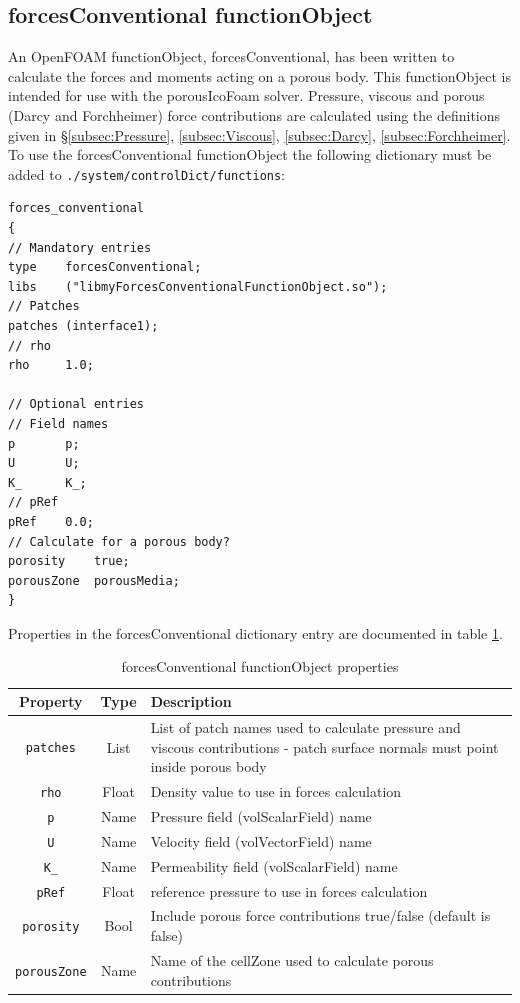 \documentclass[a4paper,11pt]{report}
\begin{document}
\subsection{forcesConventional functionObject} \label{subsec:forcesConventional}
An OpenFOAM functionObject, forcesConventional, has been written to calculate the forces and moments acting on a porous body. This functionObject is intended for use with the porousIcoFoam solver. Pressure, viscous and porous (Darcy and Forchheimer) force contributions are calculated using the definitions given in §\ref{subsec:Pressure}, \ref{subsec:Viscous}, \ref{subsec:Darcy}, \ref{subsec:Forchheimer}.
\vspace{5mm}\\
To use the forcesConventional functionObject the following dictionary must be added to \texttt{./system/controlDict/functions}:
\begin{verbatim}
forces_conventional
{
// Mandatory entries
type	forcesConventional;
libs	("libmyForcesConventionalFunctionObject.so");
// Patches
patches	(interface1);
// rho
rho		1.0;

// Optional entries
// Field names
p		p;
U		U;
K_		K_;
// pRef
pRef	0.0;
// Calculate for a porous body?
porosity	true;
porousZone	porousMedia;
}
\end{verbatim}
Properties in the forcesConventional dictionary entry are documented in table \ref{table:forcesConventional_dictionary}.
\begin{table}[ht]
\begin{center}
\begin{tabularx}{\textwidth}{ c | c | p{105mm} }
    Property & Type & Description \\
    \hline\hline
    \texttt{patches} & List & List of patch names used to calculate pressure and viscous contributions - patch surface normals must point inside porous body \\
    \hline
    \texttt{rho} & Float & Density value to use in forces calculation \\
    \hline
    \texttt{p} & Name & Pressure field (volScalarField) name \\
    \hline
    \texttt{U} & Name & Velocity field (volVectorField) name \\
    \hline
    \texttt{K\_} & Name & Permeability field (volScalarField) name \\
    \hline
    \texttt{pRef} & Float & reference pressure to use in forces calculation \\
    \hline
    \texttt{porosity} & Bool & Include porous force contributions true/false (default is false) \\
    \hline
    \texttt{porousZone} & Name & Name of the cellZone used to calculate porous contributions \\
\end{tabularx}
\end{center}
\caption{forcesConventional functionObject properties}
\label{table:forcesConventional_dictionary}
\end{table}\\
\end{document}

